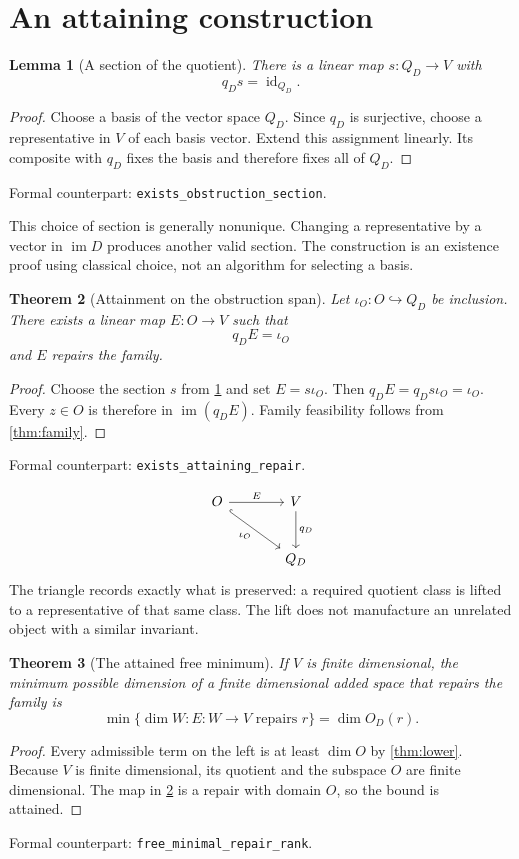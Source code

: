 \documentclass[11pt,letterpaper,oneside,openany]{book}
\theoremstyle{quiet}
\newtheorem{theorem}{Theorem}[chapter]
\newtheorem{lemma}[theorem]{Lemma}
\DeclareMathOperator{\im}{im}
\DeclareMathOperator{\id}{id}
\newcommand{\formal}[1]{\par\nobreak\begingroup\footnotesize\color{Slate}\sffamily Formal counterpart: \normalfont\nolinkurl{#1}.\par\endgroup}
\begin{document}
\section{An attaining construction}
\begin{lemma}[A section of the quotient]\label{lem:section}
There is a linear map $s:Q_D\to V$ with
\[
q_Ds=\id_{Q_D}.
\]
\end{lemma}
\begin{proof}
Choose a basis of the vector space $Q_D$. Since $q_D$ is surjective, choose a representative in $V$ of each basis vector. Extend this assignment linearly. Its composite with $q_D$ fixes the basis and therefore fixes all of $Q_D$.
\end{proof}
\formal{exists_obstruction_section}

This choice of section is generally nonunique. Changing a representative by a vector in $\im D$ produces another valid section. The construction is an existence proof using classical choice, not an algorithm for selecting a basis.

\begin{theorem}[Attainment on the obstruction span]\label{thm:attain}
Let $\iota_O:O\hookrightarrow Q_D$ be inclusion. There exists a linear map $E:O\to V$ such that
\begin{equation}\label{eq:section-on-O}
q_DE=\iota_O
\end{equation}
and $E$ repairs the family.
\end{theorem}
\begin{proof}
Choose the section $s$ from \cref{lem:section} and set $E=s\iota_O$. Then $q_DE=q_Ds\iota_O=\iota_O$. Every $z\in O$ is therefore in $\im(q_DE)$. Family feasibility follows from \cref{thm:family}.
\end{proof}
\formal{exists_attaining_repair}

\[
\begin{tikzcd}[column sep=large,row sep=large]
O \arrow[r,"E"] \arrow[dr,hook,"\iota_O"'] & V \arrow[d,"q_D"]\\
& Q_D
\end{tikzcd}
\]
The triangle records exactly what is preserved: a required quotient class is lifted to a representative of that same class. The lift does not manufacture an unrelated object with a similar invariant.

\begin{theorem}[The attained free minimum]\label{thm:minimum}
If $V$ is finite dimensional, the minimum possible dimension of a finite dimensional added space that repairs the family is
\begin{equation}\label{eq:minimum}
\min\bigl\{\dim W: E:W\to V\text{ repairs }r\bigr\}=\dim O_D(r).
\end{equation}
\end{theorem}
\begin{proof}
Every admissible term on the left is at least $\dim O$ by \cref{thm:lower}. Because $V$ is finite dimensional, its quotient and the subspace $O$ are finite dimensional. The map in \cref{thm:attain} is a repair with domain $O$, so the bound is attained.
\end{proof}
\formal{free_minimal_repair_rank}
\end{document}

